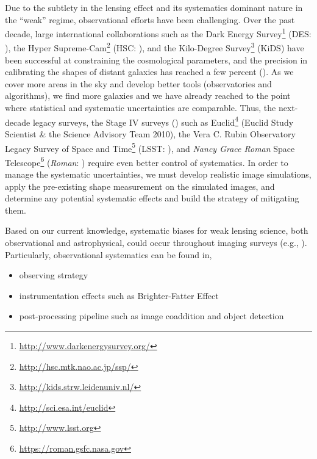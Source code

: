 \documentclass[fleqn,usenatbib]{mnras}
\begin{document}
Due to the subtlety in the lensing effect and its systematics dominant nature in the “weak” regime, observational efforts have been challenging. Over the past decade, large international collaborations such as the Dark Energy Survey\footnote{\url{http://www.darkenergysurvey.org/}} (DES: \citealt{2005astro.ph.10346T}), the Hyper Supreme-Cam\footnote{\url{http://hsc.mtk.nao.ac.jp/ssp/}} (HSC: \citealt{2018PASJ...70S...4A}), and the Kilo-Degree Survey\footnote{\url{http://kids.strw.leidenuniv.nl/}} (KiDS) have been successful at constraining the cosmological parameters, and the precision in calibrating the shapes of distant galaxies has reached a few percent (\citealt{2020arXiv201103408G, 2020arXiv201208567M, 2021A&A...645A.105G}). As we cover more areas in the sky and develop better tools (observatories and algorithms), we find more galaxies and we have already reached to the point where statistical and systematic uncertainties are comparable. Thus, the next-decade legacy surveys, the Stage IV surveys (\citealt{2006astro.ph..9591A}) such as Euclid\footnote{\url{ http://sci.esa.int/euclid}} (Euclid Study Scientist \& the Science Advisory Team 2010), the Vera C. Rubin Observatory Legacy Survey of Space and Time\footnote{\url{ http://www.lsst.org}} (LSST: \citealt{2009arXiv0912.0201L, 2019ApJ...873..111I}), and \emph{Nancy Grace Roman} Space Telescope\footnote{\url{https://roman.gsfc.nasa.gov}} (\emph{Roman}: \citealt{2015arXiv150303757S}) require even better control of systematics. In order to manage the systematic uncertainties, we must develop realistic image simulations, apply the pre-existing shape measurement on the simulated images, and determine any potential systematic effects and build the strategy of mitigating them.  


Based on our current knowledge, systematic biases for weak lensing science, both observational and astrophysical, could occur throughout imaging surveys (e.g., \citealt{2018ARA&A..56..393M}). Particularly, observational systematics can be found in, 
\begin{itemize}
    \item observing strategy
    \item instrumentation effects such as Brighter-Fatter Effect
    \item post-processing pipeline such as image coaddition and object detection
\end{itemize} 
\end{document}
